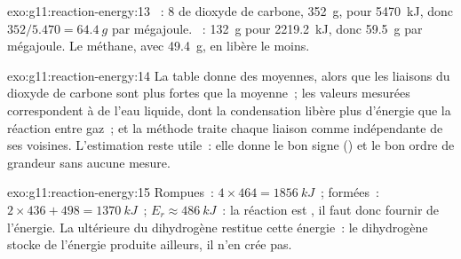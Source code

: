 \begin{solution}{exo:g11:reaction-energy:13}
~: 8  de dioxyde de carbone,
\qty{352}{g}, pour \qty{5470}{kJ}, donc $352 / 5.470 = \qty{64.4}{g}$
par mégajoule. ~: \qty{132}{g} pour
\qty{2219.2}{kJ}, donc \qty{59.5}{g} par mégajoule. Le méthane, avec
\qty{49.4}{g}, en libère le moins.
\end{solution}

\begin{solution}{exo:g11:reaction-energy:14}
La table donne des  moyennes, alors que les liaisons
 du dioxyde de carbone sont plus fortes que la moyenne~; les
valeurs mesurées correspondent à de l'eau liquide, dont la condensation
libère plus d'énergie que la réaction entre gaz~; et la méthode traite
chaque liaison comme indépendante de ses voisines. L'estimation reste
utile~: elle donne le bon signe () et le bon ordre de
grandeur sans aucune mesure.
\end{solution}

\begin{solution}{exo:g11:reaction-energy:15}
Rompues~: $4 \times 464 = \qty{1856}{kJ}$~; formées~: $2 \times 436 + 498 =
\qty{1370}{kJ}$~; $E_r \approx \qty{+486}{kJ}$~: la réaction est
, il faut donc fournir de l'énergie. La 
ultérieure du dihydrogène restitue cette énergie~: le dihydrogène stocke
de l'énergie produite ailleurs, il n'en crée pas.
\end{solution}

